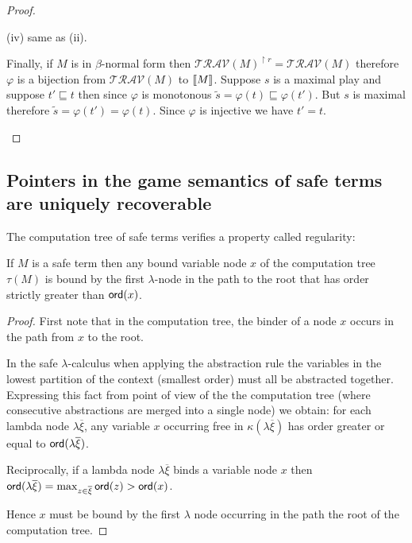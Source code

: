 \begin{proof}
\begin{itemize}
(iv) same as (ii).

\vspace{12pt}

Finally, if $M$ is in $\beta$-normal form then
$\mathcal{TRAV}(M)^{\upharpoonright r} = \mathcal{TRAV}(M)$
therefore $\varphi$ is a bijection from $\mathcal{TRAV}(M)$ to
${[\![ M ]\!]}$. Suppose $s$ is a maximal play and suppose $t' \sqsubseteq
t$ then since $\varphi$ is monotonous $\tilde{s} = \varphi(t) \sqsubseteq \varphi(t')$. But $s$ is
maximal therefore $\tilde{s} = \varphi(t') = \varphi(t)$. Since $\varphi$ is injective we have $t'=t$.

\end{itemize}
\end{proof}

%




\subsection{Pointers in the game semantics of safe terms are uniquely recoverable}

The computation tree of safe terms verifies a property called regularity:
\begin{lem}
\label{lem:regularity}
If $M$ is a safe term then any bound variable node $x$ of the computation tree $\tau(M)$ is bound
by the first $\lambda$-node in the path to the root that has
order strictly greater than ${\sf ord}(x)$.
\end{lem}
\begin{proof}
First note that in the computation tree, the binder of a node $x$ occurs in the path from $x$ to the root.

In the safe $\lambda$-calculus when applying the abstraction rule the variables in the lowest partition of the context
(smallest order) must all be abstracted together. Expressing this fact from point of view of the the computation tree
(where consecutive abstractions are merged into a single node) we obtain:
for each lambda node $\lambda \overline{\xi}$, any variable $x$ occurring free in $\kappa(\lambda \overline{\xi})$
has order greater or equal to ${\sf ord}(\lambda \overline{\xi})$.

Reciprocally, if a lambda node $\lambda \overline{\xi}$ binds a variable node $x$ then ${\sf ord}(\lambda \overline{\xi}) = \max_{z\in\overline{\xi}} {\sf ord}(z) > {\sf ord}(x)$.

Hence $x$ must be bound by the first $\lambda$ node occurring in the path the root of the computation tree.
\end{proof}



